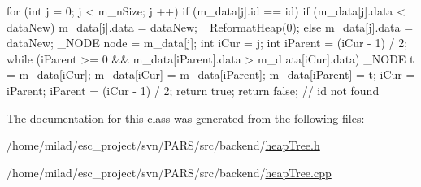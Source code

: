 \begin{DoxyCode}
{
        for (int j = 0; j < m_nSize; j ++)
                if (m_data[j].id == id) {
                        if (m_data[j].data < dataNew) {
                                m_data[j].data = dataNew;
                                _ReformatHeap(0);
                        }
                        else {
                                m_data[j].data = dataNew;
                                _NODE node = m_data[j];
                                int iCur = j;
                                int iParent = (iCur - 1) / 2;
                                while (iParent >= 0 && m_data[iParent].data > m_d
      ata[iCur].data) {
                                        _NODE t = m_data[iCur];
                                        m_data[iCur] = m_data[iParent];
                                        m_data[iParent] = t;
                                        iCur = iParent;
                                        iParent = (iCur - 1) / 2;
                                }
                        }
                        return true;
                }
                return false; // id not found
}
\end{DoxyCode}


The documentation for this class was generated from the following files:\begin{DoxyCompactItemize}
\item 
/home/milad/esc\_\-project/svn/PARS/src/backend/\hyperlink{heapTree_8h}{heapTree.h}\item 
/home/milad/esc\_\-project/svn/PARS/src/backend/\hyperlink{heapTree_8cpp}{heapTree.cpp}\end{DoxyCompactItemize}
